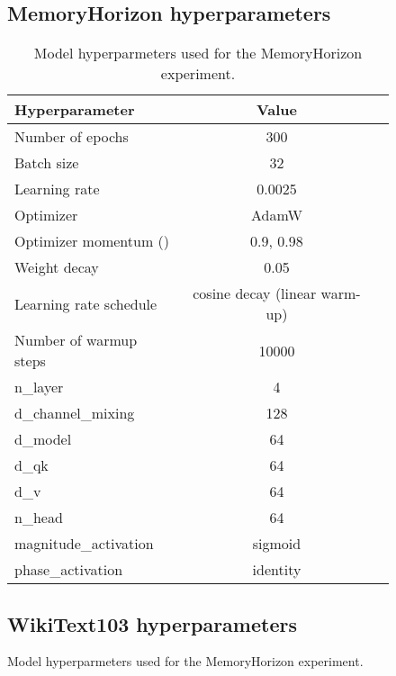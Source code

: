\documentclass{article} \usepackage{iclr2024_conference,times}
\begin{document}
\begin{figure}[H]
\begin{minipage}{0.6\textwidth}
\subsection{MemoryHorizon hyperparameters}\label{subsec:memory_horizon_hyperparams}

\begin{table}[H]
    \caption{Model hyperparmeters used for the MemoryHorizon experiment.}
    \centering
    \begin{tabular}{lcc}
        \toprule
        Hyperparameter & Value \\
        \midrule
        Number of epochs & 300 \\
        Batch size & 32 \\
        Learning rate & 0.0025 \\
        Optimizer & AdamW \\
        Optimizer momentum () & 0.9, 0.98 \\
        Weight decay & 0.05 \\
        Learning rate schedule & cosine decay (linear warm-up) \\
        Number of warmup steps & 10000 \\
        \midrule
        n\_layer & 4 \\
        d\_channel\_mixing & 128 \\
        d\_model & 64 \\
        d\_qk & 64 \\
        d\_v & 64 \\
        n\_head & 64 \\
        magnitude\_activation & sigmoid \\
        phase\_activation & identity \\
        \bottomrule
    \end{tabular}
    \label{table:general_hparams}
\end{table}

\subsection{WikiText103 hyperparameters}\label{sec:wikitext103_hyperparameters}


\end{minipage}
\end{figure}
\end{document}
